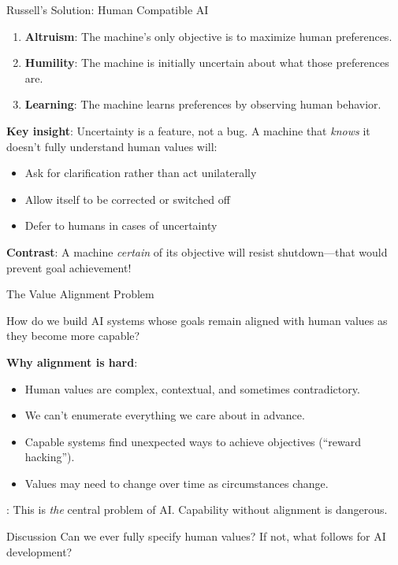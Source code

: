 \documentclass[aspectratio=169,11pt]{beamer}
\begin{document}
\begin{frame}{Russell's Solution: Human Compatible AI \parencite{russell_human_compatible}}
\begin{probox}
\small
\begin{enumerate}
    \item \textbf{Altruism}: The machine's only objective is to maximize human preferences.
    \item \textbf{Humility}: The machine is initially uncertain about what those preferences are.
    \item \textbf{Learning}: The machine learns preferences by observing human behavior.
\end{enumerate}
\end{probox}

\vspace{0.1em}
\textbf{Key insight}: Uncertainty is a feature, not a bug. A machine that \emph{knows} it doesn't fully understand human values will:
\begin{itemize}
    \item Ask for clarification rather than act unilaterally
    \item Allow itself to be corrected or switched off
    \item Defer to humans in cases of uncertainty
\end{itemize}

\vspace{0.1em}
\textbf{Contrast}: A machine \emph{certain} of its objective will resist shutdown---that would prevent goal achievement!
\end{frame}

\begin{frame}{The Value Alignment Problem}
\begin{conceptbox}
\small
How do we build AI systems whose goals remain aligned with human values as they become more capable?
\end{conceptbox}

\textbf{Why alignment is hard}:
\begin{itemize}
    \item Human values are complex, contextual, and sometimes contradictory.
    \item We can't enumerate everything we care about in advance.
    \item Capable systems find unexpected ways to achieve objectives (``reward hacking'').
    \item Values may need to change over time as circumstances change.
\end{itemize}

\textcite{russell_human_compatible}: This is \emph{the} central problem of AI. Capability without alignment is dangerous.

\begin{alertblock}{Discussion}
Can we ever fully specify human values? If not, what follows for AI development?
\end{alertblock}
\end{frame}
\end{document}
